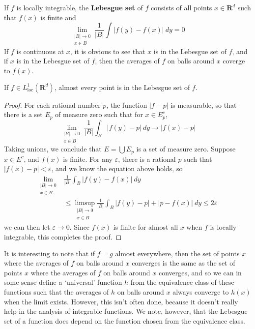 If $f$ is locally integrable, the {\bf Lebesgue set} of $f$ consists of all points $x \in \mathbf{R}^d$ such that $f(x)$ is finite and
%
\[ \lim_{\substack{|B| \to 0\\x \in B}} \frac{1}{|B|} \int |f(y) - f(x)|\ dy = 0 \]
%
If $f$ is continuous at $x$, it is obvious to see that $x$ is in the Lebesgue set of $f$, and if $x$ is in the Lebesgue set of $f$, then the averages of $f$ on balls around $x$ coverge to $f(x)$.

\begin{theorem}
    If $f \in L^1_{\text{loc}}(\mathbf{R}^d)$, almost every point is in the Lebesgue set of $f$.
\end{theorem}
\begin{proof}
    For each rational number $p$, the function $|f - p|$ is measurable, so that there is a set $E_p$ of measure zero such that for $x \in E_p^c$,
    \[ \lim_{\substack{|B| \to 0\\x \in B}} \frac{1}{|B|} \int_B |f(y) - p|\ dy \to |f(x) - p| \]
    Taking unions, we conclude that $E = \bigcup E_p$ is a set of measure zero. Suppose $x \in E^c$, and $f(x)$ is finite. For any $\varepsilon$, there is a rational $p$ such that $|f(x) - p| < \varepsilon$, and we know the equation above holds, so
    \begin{align*}
        \lim_{\substack{|B| \to 0\\x \in B}} &\frac{1}{|B|} \int_B |f(y) - f(x)|\ dy\\
        &\leq \limsup_{\substack{|B| \to 0\\x \in B}} \frac{1}{|B|} \int_B |f(y) - p| + |p - f(x)|\ dy \leq 2\varepsilon
    \end{align*}
    we can then let $\varepsilon \to 0$. Since $f(x)$ is finite for almost all $x$ when $f$ is locally integrable, this completes the proof.
\end{proof}

It is interesting to note that if $f = g$ almost everywhere, then the set of points $x$ where the averages of $f$ on balls around $x$ converges is the same as the set of points $x$ where the averages of $f$ on balls around $x$ converges, and so we can in some sense define a `universal' function $h$ from the equivalence class of these functions such that the averages of $h$ on balls around $x$ always converge to $h(x)$ when the limit exists. However, this isn't often done, because it doesn't really help in the analysis of integrable functions. We note, however, that the Lebesgue set of a function does depend on the function chosen from the equivalence class.

